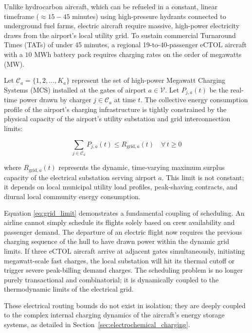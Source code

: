 \documentclass[11pt,a4paper]{book}
\begin{document}
Unlike hydrocarbon aircraft, which can be refueled in a constant, linear timeframe ($\approx 15-45$ minutes) using high-pressure hydrants connected to underground fuel farms, electric aircraft require massive, high-power electricity draws from the airport's local utility grid. To sustain commercial Turnaround Times (TATs) of under 45 minutes, a regional 19-to-40-passenger eCTOL aircraft with a $10$ MWh battery pack requires charging rates on the order of megawatts (MW).

Let $\mathcal{C}_a = \{1, 2, \dots, K_a\}$ represent the set of high-power Megawatt Charging Systems (MCS) installed at the gates of airport $a \in \mathcal{V}$. Let $P_{j, a}(t)$ be the real-time power drawn by charger $j \in \mathcal{C}_a$ at time $t$. The collective energy consumption profile of the airport's charging infrastructure is tightly constrained by the physical capacity of the airport's utility substation and grid interconnection limits:

\begin{equation}
\label{eq:grid_limit}
\sum_{j \in \mathcal{C}_a} P_{j, a}(t) \le R_{\text{grid}, a}(t) \quad \forall \, t \ge 0
\end{equation}

where $R_{\text{grid}, a}(t)$ represents the dynamic, time-varying maximum surplus capacity of the electrical substation serving airport $a$. This limit is not constant; it depends on local municipal utility load profiles, peak-shaving contracts, and diurnal local community energy consumption. 

Equation \ref{eq:grid_limit} demonstrates a fundamental coupling of scheduling. An airline cannot simply schedule its flights solely based on crew availability and passenger demand. The departure of an electric flight now requires the previous charging sequence of the hull to have drawn power within the dynamic grid limits. If three eCTOL aircraft arrive at adjacent gates simultaneously, initiating megawatt-scale fast charges, the local substation will hit its thermal cutoff or trigger severe peak-billing demand charges. The scheduling problem is no longer purely transactional and combinatorial; it is dynamically coupled to the thermodynamic limits of the electrical grid.

These electrical routing bounds do not exist in isolation; they are deeply coupled to the complex internal charging dynamics of the aircraft's energy storage systems, as detailed in Section~\ref{sec:electrochemical_charging}.
\end{document}
